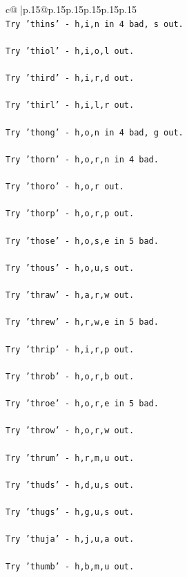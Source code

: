 \documentclass{article}
\begin{document}
{\begin{supertabular}{c@{$\;$}|p{.15\linewidth}@{}p{.15\linewidth}p{.15\linewidth}p{.15\linewidth}p{.15\linewidth}p{.15\linewidth}}
{{{\\ 
\texttt{Try 'thins' {-} h,i,n in 4 bad, s out.} \\
\\ 
\texttt{Try 'thiol' {-} h,i,o,l out.} \\
\\ 
\texttt{Try 'third' {-} h,i,r,d out.} \\
\\ 
\texttt{Try 'thirl' {-} h,i,l,r out.} \\
\\ 
\texttt{Try 'thong' {-} h,o,n in 4 bad, g out.} \\
\\ 
\texttt{Try 'thorn' {-} h,o,r,n in 4 bad.} \\
\\ 
\texttt{Try 'thoro' {-} h,o,r out.} \\
\\ 
\texttt{Try 'thorp' {-} h,o,r,p out.} \\
\\ 
\texttt{Try 'those' {-} h,o,s,e in 5 bad.} \\
\\ 
\texttt{Try 'thous' {-} h,o,u,s out.} \\
\\ 
\texttt{Try 'thraw' {-} h,a,r,w out.} \\
\\ 
\texttt{Try 'threw' {-} h,r,w,e in 5 bad.} \\
\\ 
\texttt{Try 'thrip' {-} h,i,r,p out.} \\
\\ 
\texttt{Try 'throb' {-} h,o,r,b out.} \\
\\ 
\texttt{Try 'throe' {-} h,o,r,e in 5 bad.} \\
\\ 
\texttt{Try 'throw' {-} h,o,r,w out.} \\
\\ 
\texttt{Try 'thrum' {-} h,r,m,u out.} \\
\\ 
\texttt{Try 'thuds' {-} h,d,u,s out.} \\
\\ 
\texttt{Try 'thugs' {-} h,g,u,s out.} \\
\\ 
\texttt{Try 'thuja' {-} h,j,u,a out.} \\
\\ 
\texttt{Try 'thumb' {-} h,b,m,u out.} \\
}}}
\end{supertabular}}
\end{document}
